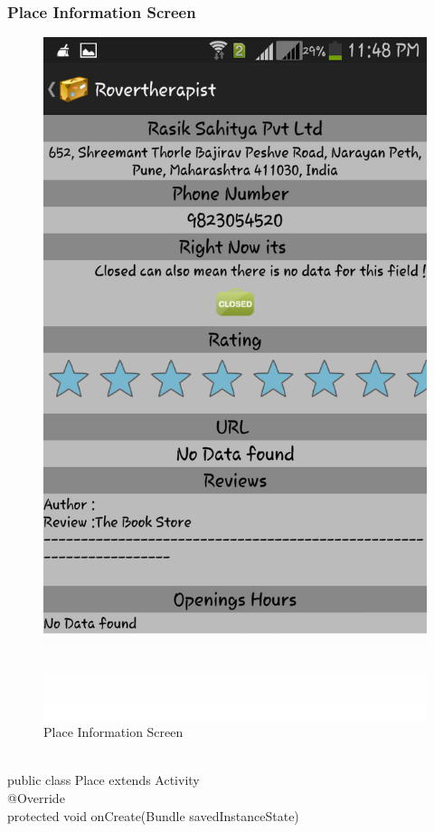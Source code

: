 \documentclass[12pt,a4paper]{article}
\begin{document}
{\newpage
\\
\subsubsection{Place Information Screen}
\begin{figure}[!htb]
\centering
\includegraphics[width=12 cm]{place}
\caption{Place Information Screen}
\end{figure}
\\
\hspace{0.7 cm}public class Place extends Activity {\\
	@Override\\
	protected void onCreate(Bundle savedInstanceState) {\\
}}}
\end{document}
